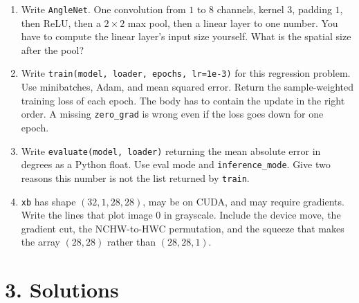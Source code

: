 \documentclass[11pt]{article}
\begin{document}
\begin{enumerate}
\item Write \texttt{AngleNet}. One convolution from $1$ to $8$ channels, kernel $3$, padding $1$, then ReLU, then a $2\times 2$ max pool, then a linear layer to one number. You have to compute the linear layer's input size yourself. What is the spatial size after the pool?

\item Write \texttt{train(model, loader, epochs, lr=1e-3)} for this regression problem. Use minibatches, Adam, and mean squared error. Return the sample-weighted training loss of each epoch. The body has to contain the update in the right order. A missing \texttt{zero\_grad} is wrong even if the loss goes down for one epoch.

\item Write \texttt{evaluate(model, loader)} returning the mean absolute error in degrees as a Python float. Use eval mode and \texttt{inference\_mode}. Give two reasons this number is not the list returned by \texttt{train}.

\item \texttt{xb} has shape $(32,1,28,28)$, may be on CUDA, and may require gradients. Write the lines that plot image $0$ in grayscale. Include the device move, the gradient cut, the NCHW-to-HWC permutation, and the squeeze that makes the array $(28,28)$ rather than $(28,28,1)$.
\end{enumerate}

\section*{3. Solutions}
\end{document}
